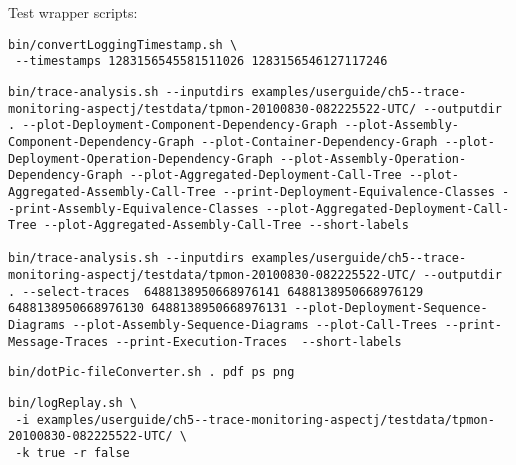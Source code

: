 \begin{compactenum}
\begin{compactenum}
\item Test wrapper scripts:
\begin{compactitem}
\item {}
\setBashListing
\begin{lstlisting}
bin/convertLoggingTimestamp.sh \
 --timestamps 1283156545581511026 1283156546127117246
\end{lstlisting}
\item {}
\setBashListing
\begin{lstlisting}
bin/trace-analysis.sh --inputdirs examples/userguide/ch5--trace-monitoring-aspectj/testdata/tpmon-20100830-082225522-UTC/ --outputdir . --plot-Deployment-Component-Dependency-Graph --plot-Assembly-Component-Dependency-Graph --plot-Container-Dependency-Graph --plot-Deployment-Operation-Dependency-Graph --plot-Assembly-Operation-Dependency-Graph --plot-Aggregated-Deployment-Call-Tree --plot-Aggregated-Assembly-Call-Tree --print-Deployment-Equivalence-Classes --print-Assembly-Equivalence-Classes --plot-Aggregated-Deployment-Call-Tree --plot-Aggregated-Assembly-Call-Tree --short-labels

bin/trace-analysis.sh --inputdirs examples/userguide/ch5--trace-monitoring-aspectj/testdata/tpmon-20100830-082225522-UTC/ --outputdir . --select-traces  6488138950668976141 6488138950668976129 6488138950668976130 6488138950668976131 --plot-Deployment-Sequence-Diagrams --plot-Assembly-Sequence-Diagrams --plot-Call-Trees --print-Message-Traces --print-Execution-Traces  --short-labels
\end{lstlisting}

% 
\item {}
\setBashListing
\begin{lstlisting}
bin/dotPic-fileConverter.sh . pdf ps png
\end{lstlisting}
\item {}
\setBashListing
\begin{lstlisting}
bin/logReplay.sh \
 -i examples/userguide/ch5--trace-monitoring-aspectj/testdata/tpmon-20100830-082225522-UTC/ \
 -k true -r false


\end{lstlisting}
\end{compactitem}
\end{compactenum}
\end{compactenum}

